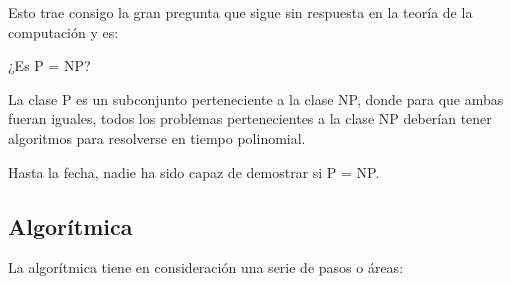 \documentclass[10pt,a4paper,spanish]{report}
\theoremstyle{definition}
\theoremstyle{remark}
\begin{document}
    Esto trae consigo la gran pregunta que sigue sin respuesta en la teoría de la computación y es:

    \begin{center}
        {\Large{¿Es P = NP?}}
    \end{center}
    
    La clase P es un subconjunto perteneciente a la clase NP, donde para que ambas fueran iguales, todos los problemas pertenecientes a la clase NP deberían tener algoritmos para resolverse en tiempo polinomial.
    
    Hasta la fecha, nadie ha sido capaz de demostrar si P = NP.\\
    \begin{center}
        
    \end{center}

    \subsection{Algorítmica}
    La algorítmica tiene en consideración una serie de pasos o áreas:
\end{document}

